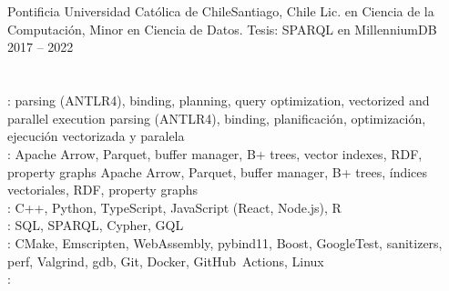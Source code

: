 \section{}
  \resumeSubHeadingListStart
    \resumeSubheading
      {Pontificia Universidad Católica de Chile}{Santiago, Chile}
      {
          {Lic. en Ciencia de la Computación, Minor en Ciencia de Datos. Tesis: SPARQL en MillenniumDB}}
      {2017 -- 2022}
  \resumeSubHeadingListEnd

\section{}
 \resumeCompactListStart
    \small{\item{
     \textbf{}{: \tr
       {parsing (ANTLR4), binding, planning, query optimization, vectorized and parallel execution}
       {parsing (ANTLR4), binding, planificación, optimización, ejecución vectorizada y paralela}} \\
     \textbf{}{: \tr
       {Apache Arrow, Parquet, buffer manager, B+ trees, vector indexes, RDF, property graphs}
       {Apache Arrow, Parquet, buffer manager, B+ trees, índices vectoriales, RDF, property graphs}} \\
     \textbf{}{: C++, Python, TypeScript, JavaScript (React, Node.js), R} \\
     \textbf{}{: SQL, SPARQL, Cypher, GQL} \\
     \textbf{}{: CMake, Emscripten, WebAssembly, pybind11, Boost, GoogleTest,
       sanitizers, perf, Valgrind, gdb, Git, Docker, GitHub~Actions, Linux} \\
     \textbf{}{: }
    }}
 \resumeCompactListEnd


